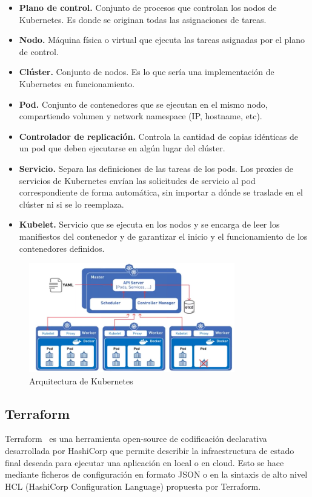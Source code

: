 	\begin{itemize}
		\item \textbf{Plano de control.} Conjunto de procesos que controlan los nodos de Kubernetes. Es donde se originan todas las asignaciones de tareas.
		\item \textbf{Nodo.} Máquina física o virtual que ejecuta las tareas asignadas por el plano de control.
		\item \textbf{Clúster.} Conjunto de nodos. Es lo que sería una implementación de Kubernetes en funcionamiento.
		\item \textbf{Pod.} Conjunto de contenedores que se ejecutan en el mismo nodo, compartiendo volumen y network namespace (IP, hostname, etc).
		\item \textbf{Controlador de replicación.} Controla la cantidad de copias idénticas de un pod que deben ejecutarse en algún lugar del clúster.
		\item \textbf{Servicio.} Separa las definiciones de las tareas de los pods. Los proxies de servicios de Kubernetes envían las solicitudes de servicio al pod correspondiente de forma automática, sin importar a dónde se traslade en el clúster ni si se lo reemplaza.
		\item \textbf{Kubelet.} Servicio que se ejecuta en los nodos y se encarga de leer los manifiestos del contenedor y de garantizar el inicio y el funcionamiento de los contenedores definidos.
	\end{itemize}

	\begin{figure}[h]
	\centering
	\includegraphics[width=0.8\textwidth]{../imgs/EdA/k8s-arch.png}
	\caption{Arquitectura de Kubernetes}
	\label{fig:k8s}
	\end{figure}

\subsection{Terraform}
	Terraform~\cite{orq4} es una herramienta open-source de codificación declarativa desarrollada por HashiCorp que permite describir la infraestructura de estado final deseada para ejecutar una aplicación en local o en cloud. Esto se hace mediante ficheros de configuración en formato JSON o en la sintaxis de alto nivel HCL (HashiCorp Configuration Language) propuesta por Terraform. 

